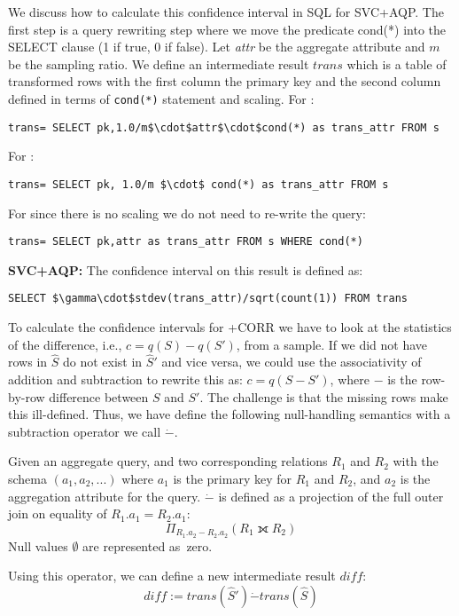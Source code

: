 We discuss how to calculate this confidence interval in SQL for SVC+AQP.
The first step is a query rewriting step where we move the predicate \textsf{cond(*)} into the SELECT clause (1 if true, 0 if false). 
Let \emph{attr} be the aggregate attribute and $m$ be the sampling ratio. 
We define an intermediate result $trans$ which is a table of transformed rows with the first column the 
primary key and the second column defined in terms of \texttt{cond(*)} statement and scaling.
For \sumfunc:
\begin{lstlisting}[mathescape,basicstyle={\scriptsize}]
trans= SELECT pk,1.0/m$\cdot$attr$\cdot$cond(*) as trans_attr FROM s 
\end{lstlisting} 
For \countfunc:
\begin{lstlisting}[mathescape,basicstyle={\scriptsize}]
trans= SELECT pk, 1.0/m $\cdot$ cond(*) as trans_attr FROM s
\end{lstlisting}
For \avgfunc since there is no scaling we do not need to re-write the query:
\begin{lstlisting}[mathescape,basicstyle={\scriptsize}]
trans= SELECT pk,attr as trans_attr FROM s WHERE cond(*) 
\end{lstlisting}

\vspace{0.25em}

\noindent\textbf{SVC+AQP: } The confidence interval on this result is defined 
as:
\begin{lstlisting}[mathescape,basicstyle={\scriptsize}]
SELECT $\gamma\cdot$stdev(trans_attr)/sqrt(count(1)) FROM trans
\end{lstlisting}

\vspace{0.25em}

To calculate the confidence intervals for \svcnospace+CORR we have to look at the statistics of the difference, i.e., $c = q(S) - q(S')$, from a sample.
If we did not have rows in $\widehat{S}$ do not exist in $\widehat{S}'$ and vice versa, we could use the associativity of addition and subtraction to rewrite this as:
$c = q(S - S')$, where $-$ is the row-by-row difference between $S$ and $S'$.
The challenge is that the missing rows make this ill-defined.
Thus, we have define the following null-handling semantics with a subtraction operator we call $\dot{-}$.
\begin{definition} Given an aggregate query, and two corresponding relations $R_1$ and $R_2$ with the schema $(a_1, a_2, ...)$ where $a_1$ is the primary key for $R_1$ and $R_2$, and $a_2$ is the aggregation attribute for the query. 
$\dot{-}$ is defined as a projection of the full outer join on equality of $R_1.a_1 = R_2.a_1$: \[ \Pi_{R_1.a_2 - R_2.a_2} ( R_1 \fullouterjoin R_2 ) \]
Null values $\emptyset$ are represented as~zero.
\end{definition}
Using this operator, we can define a new intermediate result $diff$:
\[diff := trans(\widehat{S}') \dot{-} trans(\widehat{S}) \]

